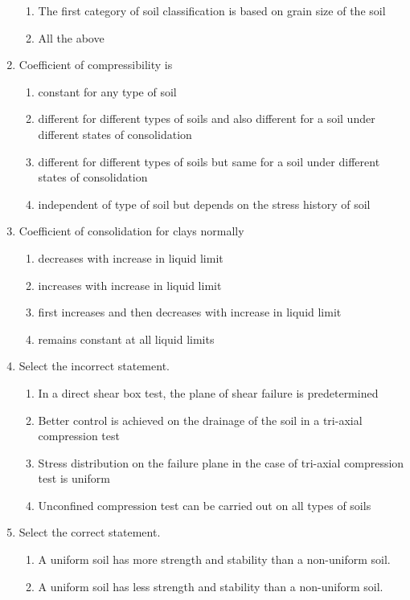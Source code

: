 \documentclass[11pt,a4paper]{article}
\begin{document}
\begin{enumerate}
\begin{enumerate}[label=\Alph*.]
\item{The first category of soil classification is based on grain size of the soil}
\item{All the above}
\end{enumerate}
\item{Coefficient of compressibility is}
\begin{enumerate}[label=\Alph*.]
\item{constant for any type of soil}
\item{different for different types of soils and also different for a soil under different states of consolidation}
\item{different for different types of soils but same for a soil under different states of consolidation}
\item{independent of type of soil but depends on the stress history of soil}
\end{enumerate}
\item{Coefficient of consolidation for clays normally}
\begin{enumerate}[label=\Alph*.]
\item{decreases with increase in liquid limit}
\item{increases with increase in liquid limit}
\item{first increases and then decreases with increase in liquid limit}
\item{remains constant at all liquid limits}
\end{enumerate}
\item{Select the incorrect statement.}
\begin{enumerate}[label=\Alph*.]
\item{In a direct shear box test, the plane of shear failure is predetermined}
\item{Better control is achieved on the drainage of the soil in a tri-axial compression test}
\item{Stress distribution on the failure plane in the case of tri-axial compression test is uniform}
\item{Unconfined compression test can be carried out on all types of soils}
\end{enumerate}
\item{Select the correct statement.}
\begin{enumerate}[label=\Alph*.]
\item{A uniform soil has more strength and stability than a non-uniform soil.}
\item{A uniform soil has less strength and stability than a non-uniform soil.}

\end{enumerate}
\end{enumerate}
\end{document}
